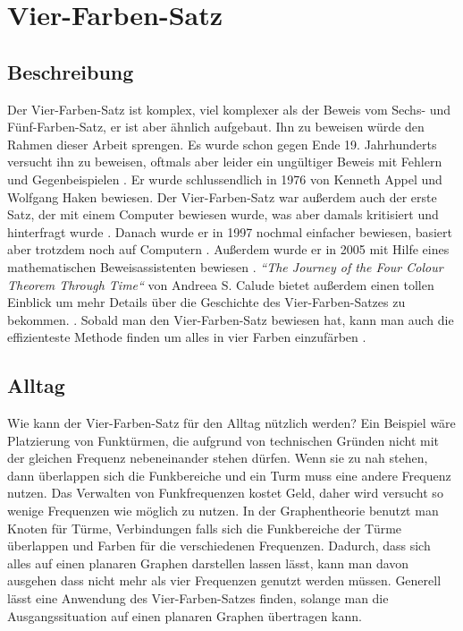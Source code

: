 \section{Vier-Farben-Satz}
\subsection{Beschreibung}
Der Vier-Farben-Satz ist komplex, viel komplexer als der Beweis vom Sechs- und Fünf-Farben-Satz, er ist aber ähnlich aufgebaut. Ihn zu beweisen würde den Rahmen dieser Arbeit sprengen. Es wurde schon gegen Ende 19. Jahrhunderts versucht ihn zu beweisen, oftmals aber leider ein ungültiger Beweis mit Fehlern und Gegenbeispielen \cite{wrong_proof}. Er wurde schlussendlich in 1976 von Kenneth Appel und Wolfgang Haken bewiesen. Der Vier-Farben-Satz war außerdem auch der erste Satz, der mit einem Computer bewiesen wurde, was aber damals kritisiert und hinterfragt wurde \cite{implications}. Danach wurde er in 1997 nochmal einfacher bewiesen, basiert aber trotzdem noch auf Computern \cite{robertson_new-proof}. Außerdem wurde er in 2005 mit Hilfe eines mathematischen Beweisassistenten bewiesen \cite{formal_proof}. \textit{``The Journey of the Four Colour Theorem Through Time``} von Andreea S. Calude bietet außerdem einen tollen Einblick um mehr Details über die Geschichte des Vier-Farben-Satzes zu bekommen. \cite{journey_through_time}. Sobald man den Vier-Farben-Satz bewiesen hat, kann man auch die effizienteste Methode finden um alles in vier Farben einzufärben \cite{efficiently_coloring}.

\subsection{Alltag}
Wie kann der Vier-Farben-Satz für den Alltag nützlich werden? Ein Beispiel wäre Platzierung von Funktürmen, die aufgrund von technischen Gründen nicht mit der gleichen Frequenz nebeneinander stehen dürfen. Wenn sie zu nah stehen, dann überlappen sich die Funkbereiche und ein Turm muss eine andere Frequenz nutzen. Das Verwalten von Funkfrequenzen kostet Geld, daher wird versucht so wenige Frequenzen wie möglich zu nutzen. In der Graphentheorie benutzt man Knoten für Türme, Verbindungen falls sich die Funkbereiche der Türme überlappen und Farben für die verschiedenen Frequenzen. Dadurch, dass sich alles auf einen planaren Graphen darstellen lassen lässt, kann man davon ausgehen dass nicht mehr als vier Frequenzen genutzt werden müssen. Generell lässt eine Anwendung des Vier-Farben-Satzes finden, solange man die Ausgangssituation auf einen planaren Graphen übertragen kann.